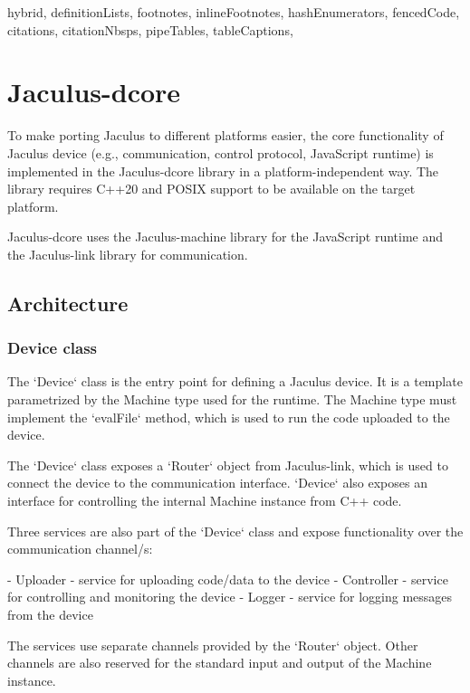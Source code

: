 \begin{markdown*}{%
  hybrid,
  definitionLists,
  footnotes,
  inlineFootnotes,
  hashEnumerators,
  fencedCode,
  citations,
  citationNbsps,
  pipeTables,
  tableCaptions,
}

\chapter{Jaculus-dcore}

To make porting Jaculus to different platforms easier, the core functionality of Jaculus device (e.g., communication, control protocol, JavaScript runtime) is implemented in the Jaculus-dcore library in a platform-independent way. The library requires C++20 and POSIX support to be available on the target platform.

Jaculus-dcore uses the Jaculus-machine library for the JavaScript runtime and the Jaculus-link library for communication.

\section{Architecture}

\subsection{Device class}

The `Device` class is the entry point for defining a Jaculus device. It is a template parametrized by the Machine type used for the runtime. The Machine type must implement the `evalFile` method, which is used to run the code uploaded to the device.

The `Device` class exposes a `Router` object from Jaculus-link, which is used to connect the device to the communication interface. `Device` also exposes an interface for controlling the internal Machine instance from C++ code.

Three services are also part of the `Device` class and expose functionality over the communication channel/s:

  - Uploader - service for uploading code/data to the device
  - Controller - service for controlling and monitoring the device
  - Logger - service for logging messages from the device

The services use separate channels provided by the `Router` object. Other channels are also reserved for the standard input and output of the Machine instance.


\end{markdown*}

